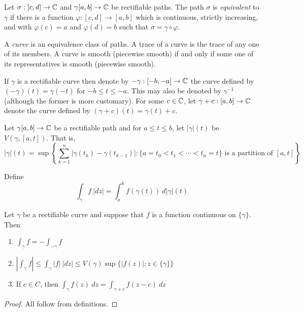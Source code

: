 \begin{definition}
    Let $\sigma: [c,d]\to\mathbb{C}$ and $\gamma[a,b]\to\mathbb{C}$ be rectifiable paths. The path $\sigma$ is \textit{equivalent} to $\gamma$ if there is a function $\varphi: [c,d]\to[a,b]$ which is continuous, strictly increasing, and with $\varphi(c) = a$ and $\varphi(d) = b$ such that $\sigma = \gamma\circ\varphi$.

    A \textit{curve} is an equivalence class of paths. A trace of a curve is the trace of any one of its members. A curve is smooth (piecewise smooth) if and only if some one of its representatives is smooth (piecewise smooth).
\end{definition}

\begin{definition}
    If $\gamma$ is a rectifiable curve then denote by $-\gamma: [-b, -a]\to\mathbb{C}$ the curve defined by $(-\gamma)(t) = \gamma(-t)$ for $-b\le t\le -a$. This may also be denoted by $\gamma^{-1}$ (although the former is more customary). For some $c\in\mathbb{C}$, let $\gamma + c: [a,b]\to\mathbb{C}$ denote the curve defined by $(\gamma + c)(t) = \gamma(t) + c$.
\end{definition}

\begin{definition}
    Let $\gamma[a,b]\to\mathbb{C}$ be a rectifiable path and for $a\le t\le b$, let $|\gamma|(t)$ be $V(\gamma, [a,t])$. That is,
    \begin{equation*}
        |\gamma|(t) = \sup\left\{\sum_{k = 1}^n|\gamma(t_k) - \gamma(t_{k - 1})| : \{a = t_0 < t_1 < \cdots < t_n = t\}\text{ is a partition of $[a,t]$}\right\}
    \end{equation*}

    Define 
    \begin{equation*}
        \int_\gamma f~|dz| = \int_a^bf(\gamma(t))~d|\gamma|(t)
    \end{equation*}
\end{definition}

\begin{proposition}
    Let $\gamma$ be a rectifiable curve and suppose that $f$ is a function continuous on $\{\gamma\}$. Then 
    \begin{enumerate}[label=(\alph*)]
        \item $\int_\gamma f = -\int_{-\gamma}f$
        \item $\left|\int_\gamma f\right| \le \int_\gamma|f|~|dz|\le V(\gamma)\sup\{|f(z)|: z\in\{\gamma\}\}$
        \item If $c\in C$, then $\int_\gamma f(z)~dz = \int_{\gamma + c} f(z - c)~dz$
    \end{enumerate}
\end{proposition}
\begin{proof}
    All follow from definitions.
\end{proof}

